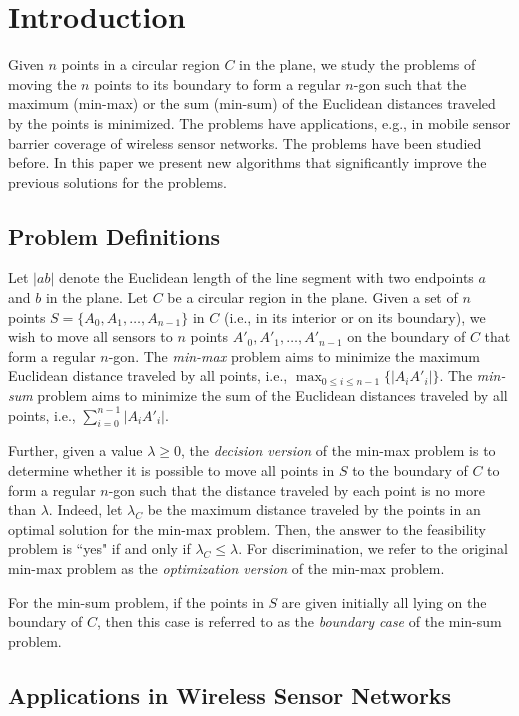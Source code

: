 \documentclass[11pt]{article}
\begin{document}
\section{Introduction}

Given $n$ points in a circular region $C$ in the plane, we study the problems of
moving the $n$ points to its boundary to form a regular $n$-gon such that
the maximum (min-max) or the sum (min-sum) of the Euclidean
distances traveled by the points is minimized. The problems have
applications, e.g., in mobile sensor barrier coverage of wireless
sensor networks. The problems have
been studied before. In this paper we present new algorithms that significantly
improve the previous solutions for the problems.

\subsection{Problem Definitions}

Let $|ab|$ denote the Euclidean length of the line segment with two
endpoints $a$ and $b$ in the plane. Let $C$ be a circular region in
the plane. Given a set of $n$ points $S=\{A_0,A_1,\ldots,A_{n-1}\}$ in
$C$ (i.e., in its interior or on its boundary), we wish to move all sensors to
$n$ points $A'_0,A'_1,\ldots, A'_{n-1}$ on the boundary of $C$ that
form a regular $n$-gon. The {\em min-max} problem aims to minimize
the maximum Euclidean distance traveled by all points, i.e.,
$\max_{0\leq i\leq n-1}\{|A_{i} A'_{i}|\}$. The {\em min-sum}
problem aims to minimize the sum of the Euclidean distances traveled
by all points, i.e., $\sum_{i=0}^{n-1} |A_{i} A'_{i}|$.

Further, given a value $\lambda\geq 0$, the {\em decision version} of
the min-max problem is to determine whether it is possible to move all points in
$S$ to the boundary of $C$ to form a regular $n$-gon such that the distance
traveled by each point is no more than $\lambda$. Indeed,
let $\lambda_C$ be the maximum distance traveled by the points in
an optimal solution for the min-max problem. Then, the answer to the
feasibility problem is ``yes" if and only if $\lambda_C\leq
\lambda$. For discrimination, we refer to the original min-max
problem as the {\em optimization version} of the min-max problem.

For the min-sum problem, if the points in $S$ are given initially all lying on the
boundary of $C$, then this case is referred to as the {\em boundary
case} of the min-sum problem.

\subsection{Applications in Wireless Sensor Networks}
\end{document}
